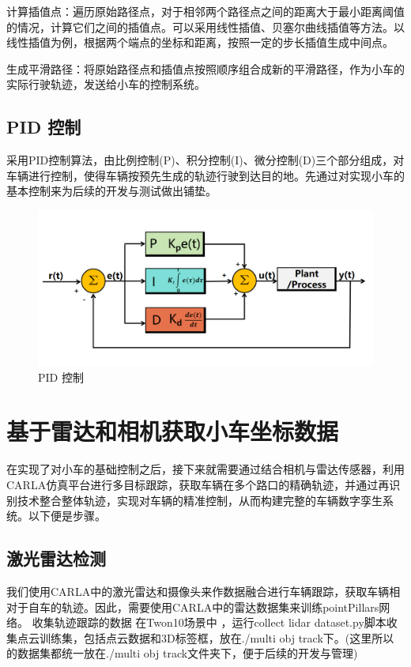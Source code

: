 计算插值点：遍历原始路径点，对于相邻两个路径点之间的距离大于最小距离阈值的情况，计算它们之间的插值点。可以采用线性插值、贝塞尔曲线插值等方法。以线性插值为例，根据两个端点的坐标和距离，按照一定的步长插值生成中间点。

生成平滑路径：将原始路径点和插值点按照顺序组合成新的平滑路径，作为小车的实际行驶轨迹，发送给小车的控制系统。

\subsection{PID 控制}
采用PID控制算法，由比例控制(P)、积分控制(I)、微分控制(D)三个部分组成，对车辆进行控制，使得车辆按预先生成的轨迹行驶到达目的地。先通过对实现小车的基本控制来为后续的开发与测试做出铺垫。


\begin{figure}[htbp] %
	\centering
	\includegraphics[width=1\textwidth]{p17} %
	\caption{PID 控制} %
	\label{fig:p17} %
\end{figure}






\section{基于雷达和相机获取小车坐标数据}
在实现了对小车的基础控制之后，接下来就需要通过结合相机与雷达传感器，利用CARLA仿真平台进行多目标跟踪，获取车辆在多个路口的精确轨迹，并通过再识别技术整合整体轨迹，实现对车辆的精准控制，从而构建完整的车辆数字孪生系统。以下便是步骤。

\subsection{激光雷达检测}
我们使用CARLA中的激光雷达和摄像头来作数据融合进行车辆跟踪，获取车辆相对于自车的轨迹。因此，需要使用CARLA中的雷达数据集来训练pointPillars网络。
收集轨迹跟踪的数据
在Twon10场景中 ，运行collect lidar dataset.py脚本收集点云训练集，包括点云数据和3D标签框，放在./multi obj track下。(这里所以的数据集都统一放在./multi obj track文件夹下，便于后续的开发与管理)
